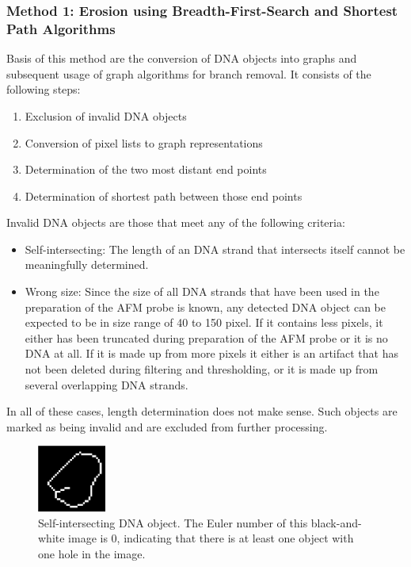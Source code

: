 \documentclass{article}
\begin{document}
\subsubsection{Method 1: Erosion using Breadth-First-Search and Shortest Path Algorithms}
Basis of this method are the conversion of DNA objects into graphs and subsequent usage of graph algorithms for branch removal. It consists of the following steps:
\begin{enumerate}
	\item Exclusion of invalid DNA objects
	\item Conversion of pixel lists to graph representations
	\item Determination of the two most distant end points
	\item Determination of shortest path between those end points
\end{enumerate}
Invalid DNA objects are those that meet any of the following criteria:
\begin{itemize}
	\item Self-intersecting: The length of an DNA strand that intersects itself cannot be meaningfully determined.
	\item Wrong size: Since the size of all DNA strands that have been used in the preparation of the AFM probe is known, any detected DNA object can be expected to be in size range of 40 to 150 pixel. If it contains less pixels, it either has been truncated during preparation of the AFM probe or it is no DNA at all. If it is made up from more pixels it either is an artifact that has not been deleted during filtering and thresholding, or it is made up from several overlapping DNA strands. 
\end{itemize}
In all of these cases, length determination does not make sense. Such objects are marked as being invalid and are excluded from further processing.
\begin{figure}[htb!]
	\centering
	\includegraphics[width = 0.2\textwidth]{dna_with_loop.png}
	\caption{Self-intersecting DNA object. The Euler number of this black-and-white image is 0, indicating that there is at least one object with one hole in the image.}
	\label{fig:dna_with_loop}
\end{figure}
\end{document}
